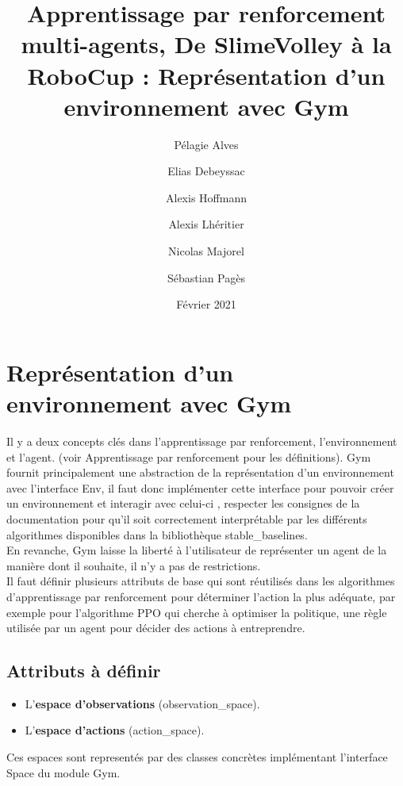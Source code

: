 \documentclass[11pt, a4paper]{article}
\title{Apprentissage par renforcement multi-agents, De SlimeVolley à la RoboCup : Représentation d'un environnement avec Gym}
\author{Pélagie Alves\and Elias Debeyssac\and Alexis Hoffmann\and
Alexis Lhéritier\and Nicolas Majorel\and Sébastian Pagès}
\date{Février 2021}
\begin{document}
\maketitle

\newpage

\tableofcontents

\newpage


\section{Représentation d'un environnement avec Gym}


Il y a deux concepts clés dans l'apprentissage par renforcement, l'environnement et l'agent. (voir Apprentissage par renforcement pour les définitions).
Gym fournit principalement une abstraction de la représentation d'un environnement \cite{1606.01540} avec l'interface Env, il faut donc implémenter cette interface pour pouvoir créer un 
environnement et interagir avec celui-ci , respecter les consignes de la documentation \cite{core.py} pour qu'il soit correctement interprétable par les
différents algorithmes disponibles dans la bibliothèque stable\_baselines.\\
En revanche, Gym laisse la liberté à l'utilisateur de représenter un agent de la manière dont il souhaite, il n'y a pas de restrictions. \\

\noindent Il faut définir plusieurs attributs de base qui sont réutilisés dans les algorithmes d'apprentissage par renforcement pour déterminer l'action la plus adéquate, par exemple
pour l'algorithme PPO qui cherche à optimiser la politique, une règle utilisée par un agent pour décider des actions à entreprendre.\\

\subsection{ \textbf{Attributs à définir}} 
\begin{itemize}
	\item L'\textbf{espace d'observations} (observation\_space). 
	\item L'\textbf{espace d'actions} (action\_space). 
\end{itemize}

\noindent Ces espaces sont representés par des classes concrètes \cite{observation-and-action-spaces} implémentant l'interface Space \cite{space.py} du module Gym.
\end{document}

